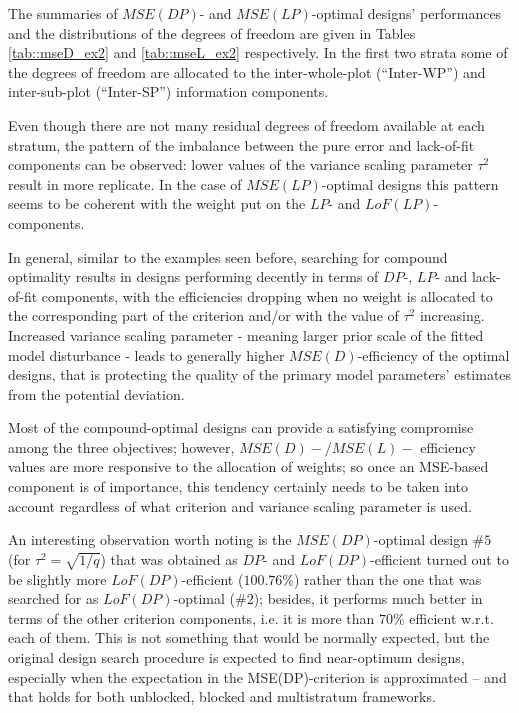 The summaries of $MSE(DP)$- and $MSE(LP)$-optimal designs' performances and the distributions of the degrees of freedom are given in Tables \ref{tab::mseD_ex2} and \ref{tab::mseL_ex2} respectively. In the first two strata some of the degrees of freedom are allocated to the inter-whole-plot (``Inter-WP'') and inter-sub-plot (``Inter-SP'') information components. 

Even though there are not many residual degrees of freedom available at each stratum, the pattern of the imbalance between the pure error and lack-of-fit components can be observed: lower values of the variance scaling parameter $\tau^2$ result in more replicate. In the case of $MSE(LP)$-optimal designs this pattern seems to be coherent with the weight put on the $LP$- and $LoF(LP)$-components. 

In general, similar to the examples seen before, searching for compound optimality results in designs performing decently in terms of $DP$-, $LP$- and lack-of-fit components, with the efficiencies dropping when no weight is allocated to the corresponding part of the criterion and/or with the value of $\tau^2$ increasing. Increased variance scaling parameter - meaning larger prior scale of the fitted model disturbance - leads to generally higher $MSE(D)$-efficiency of the optimal designs, that is protecting the quality of the primary model parameters' estimates from the potential deviation.

Most of the compound-optimal designs can provide a satisfying compromise among the three objectives; however, $MSE(D)-/MSE(L)-$ efficiency values are more responsive to the allocation of weights; so once an MSE-based component is of importance, this tendency certainly needs to be taken into account regardless of what criterion and variance scaling parameter is used.

An interesting observation worth noting is the $MSE(DP)$-optimal design \#$5$ (for $\tau^2=\sqrt{1/q}$) that was obtained as $DP$- and $LoF(DP)$-efficient turned out to be slightly more $LoF(DP)$-efficient ($100.76\%$) rather than the one that was searched for as $LoF(DP)$-optimal (\#$2$); besides, it performs much better in terms of the other criterion components, i.e. it is more than $70\%$ efficient w.r.t. each of them. This is not something that would be normally expected, but the original design search procedure is expected to find near-optimum designs, especially when the expectation in the MSE(DP)-criterion is approximated -- and that holds for both unblocked, blocked and multistratum frameworks. 

